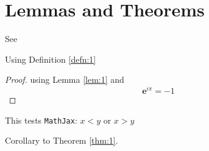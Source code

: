 \section[L and T]{Lemmas and Theorems}

\begin{Lem}[A Lemma]\label{lem:1}
  \lipsum[3]

  See \cite{wiki:it:tautol}
\end{Lem}

\begin{Theorem}\label{thm:1}
  Using Definition \ref{defn:1} \\
  \lipsum[4]
  \begin{proof}
    using Lemma \ref{lem:1} and
    \begin{equation}
      \label{eq:1}
      {\mathbf{e}}^{i \pi }=-1
    \end{equation}
  \end{proof}
  This tests \texttt{MathJax}: $x<y$ or $x>y$
\end{Theorem}

\lipsum[5]

\begin{Cor}\label{cor:1}
  Corollary to Theorem \ref{thm:1}.
  \\
  \lipsum[6]
\end{Cor}

